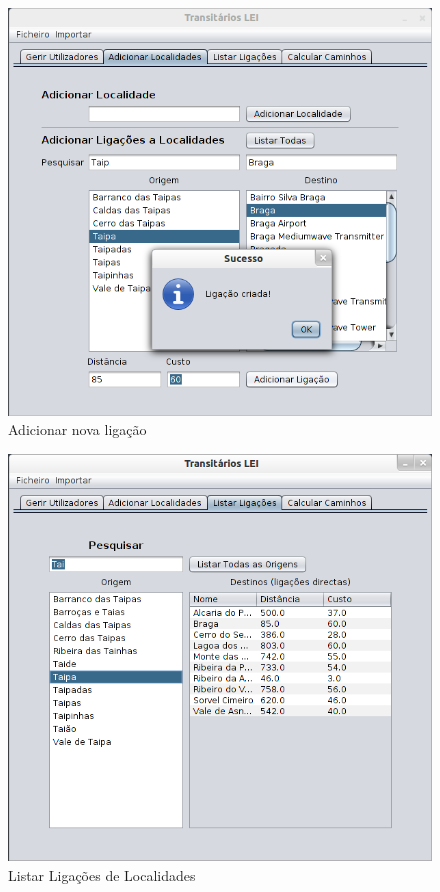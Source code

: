\documentclass[a5paper,twocolumn, 11pt]{article}
\begin{document}
\begin{figure}[h!b!t!]
    \caption[Nova Ligação]{Adicionar nova ligação}
    \centering
        \includegraphics[width=330pt]{interface_5.png}
\end{figure}
\begin{figure}[h!b!t!]
    \caption[Listar Ligações]{Listar Ligações de Localidades}
    \centering
        \includegraphics[width=330pt]{interface_6.png}
\end{figure}
\end{document}

